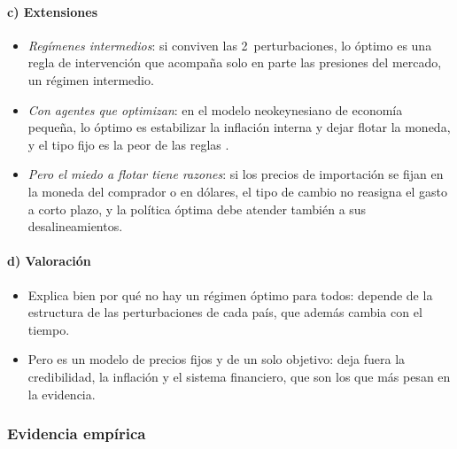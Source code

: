 \documentclass[11pt]{article}
\begin{document}
\paragraph{c) Extensiones}

\begin{itemize}
\item \emph{Regímenes intermedios}: si conviven las 2~perturbaciones, lo óptimo es una regla de intervención que acompaña solo en parte las presiones del mercado, un régimen intermedio\nocite{Boyer1978Optimal}.
\item \emph{Con agentes que optimizan}: en el modelo neokeynesiano de economía pequeña, lo óptimo es estabilizar la inflación interna y dejar flotar la moneda, y el tipo fijo es la peor de las reglas\nocite{GaliMonacelli2005Monetary} .
\item \emph{Pero el miedo a flotar tiene razones}: si los precios de importación se fijan en la moneda del comprador o en dólares, el tipo de cambio no reasigna el gasto a corto plazo, y la política óptima debe atender también a sus desalineamientos\nocite{Engel2011Currency}.
\end{itemize}

\paragraph{d) Valoración}

\begin{itemize}
\item Explica bien por qué no hay un régimen óptimo para todos: depende de la estructura de las perturbaciones de cada país, que además cambia con el tiempo.
\item Pero es un modelo de precios fijos y de un solo objetivo: deja fuera la credibilidad, la inflación y el sistema financiero, que son los que más pesan en la evidencia.
\end{itemize}

\subsubsection{Evidencia empírica}\label{sec:evidencia-regimenes}
\end{document}
